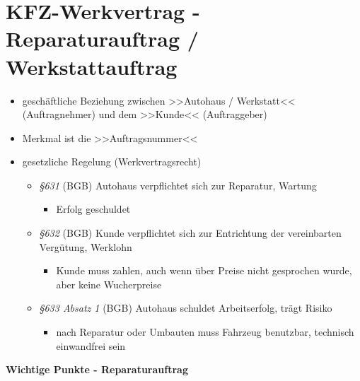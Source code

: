 \section{KFZ-Werkvertrag - Reparaturauftrag /
Werkstattauftrag}\label{kfz-werkvertrag-reparaturauftrag-werkstattauftrag}

\begin{itemize}
\item
  geschäftliche Beziehung zwischen >>Autohaus / Werkstatt<<
  (Auftragnehmer) und dem >>Kunde<< (Auftraggeber)
\item
  Merkmal ist die >>Auftragsnummer<<
\item
  gesetzliche Regelung (Werkvertragsrecht)

  \begin{itemize}
  \item
    \emph{§631} (BGB) Autohaus verpflichtet sich zur Reparatur, Wartung

    \begin{itemize}
    \item
      Erfolg geschuldet
    \end{itemize}
  \item
    \emph{§632} (BGB) Kunde verpflichtet sich zur Entrichtung der
    vereinbarten Vergütung, Werklohn

    \begin{itemize}
    \item
      Kunde muss zahlen, auch wenn über Preise nicht gesprochen wurde,
      aber keine Wucherpreise
    \end{itemize}
  \item
    \emph{§633 Absatz 1} (BGB) Autohaus schuldet Arbeitserfolg, trägt
    Risiko

    \begin{itemize}
    \item
      nach Reparatur oder Umbauten muss Fahrzeug benutzbar, technisch
      einwandfrei sein
    \end{itemize}
  \end{itemize}
\end{itemize}

\textbf{Wichtige Punkte - Reparaturauftrag}

